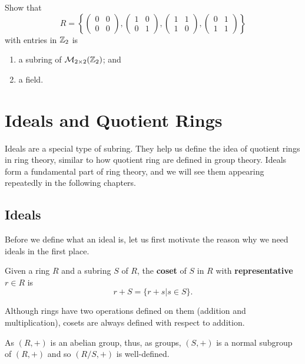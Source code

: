 \begin{problem}
    Show that
    \[
        R = \left\{\begin{pmatrix}0&0\\0&0\end{pmatrix},\begin{pmatrix}1&0\\0&1\end{pmatrix},\begin{pmatrix}1&1\\1&0\end{pmatrix},\begin{pmatrix}0&1\\1&1\end{pmatrix}\right\}
    \]
    with entries in $\mathbb{Z}_2$ is
    \begin{enumerate}[label=(\roman*)]
        \item a subring of $\mathcal{M}_{2\times2}(\mathbb{Z}_2)$; and
        \item a field.
    \end{enumerate}
\end{problem}

\chapter{Ideals and Quotient Rings}
Ideals are a special type of subring. They help us define the idea of quotient rings in ring theory, similar to how quotient ring are defined in group theory. Ideals form a fundamental part of ring theory, and we will see them appearing repeatedly in the following chapters.

\section{Ideals}
Before we define what an ideal is, let us first motivate the reason why we need ideals in the first place.
\begin{definition}
    Given a ring $R$ and a subring $S$ of $R$, the \textbf{coset} of $S$ in $R$ with \textbf{representative} $r \in R$ is
    \[
        r + S = \{r+s \vert s \in S\}.
    \]
\end{definition}
\begin{remark}
    Although rings have two operations defined on them (addition and multiplication), cosets are always defined with respect to addition.
\end{remark}
\begin{remark}
    As $(R,+)$ is an abelian group, thus, as groups, $(S,+)$ is a normal subgroup of $(R,+)$ and so $(R/S,+)$ is well-defined.
\end{remark}


